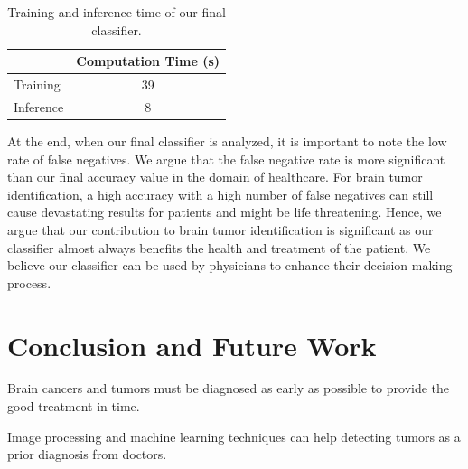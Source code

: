 \documentclass[conference]{IEEEtran}
\begin{document}
\begin{table}[h]
\centering
\caption{Training and inference time of our final classifier. }
\label{tab:my-table}

\begin{tabular}{|l|c|}
\hline
          & \multicolumn{1}{l|}{Computation Time (s)} \\ \hline
Training  & 39                                        \\ \hline
Inference & 8                                         \\ \hline
\end{tabular}
\end{table}

At the end, when our final classifier is analyzed, it is important to note the low rate of false negatives. We argue that the false negative rate is more significant than our final accuracy value in the domain of healthcare. For brain tumor identification, a high accuracy with a high number of false negatives can still cause devastating results for patients and might be life threatening. Hence, we argue that our contribution to brain tumor identification is significant as our classifier almost always benefits the health and treatment of the patient. We believe our classifier can be used by physicians to enhance their decision making process.  


\section{Conclusion and Future Work}\label{conclusion}
Brain cancers and tumors must be diagnosed as early as possible to provide the good treatment in time.

Image processing and machine learning techniques can help detecting tumors as a prior diagnosis from doctors.
\end{document}
